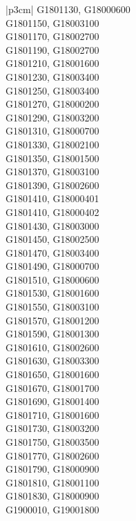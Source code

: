 \begin{customLongTable}{ |p{3cm}| }
G1801130, G18000600 \\ \hline
G1801150, G18003100 \\ \hline
G1801170, G18002700 \\ \hline
G1801190, G18002700 \\ \hline
G1801210, G18001600 \\ \hline
G1801230, G18003400 \\ \hline
G1801250, G18003400 \\ \hline
G1801270, G18000200 \\ \hline
G1801290, G18003200 \\ \hline
G1801310, G18000700 \\ \hline
G1801330, G18002100 \\ \hline
G1801350, G18001500 \\ \hline
G1801370, G18003100 \\ \hline
G1801390, G18002600 \\ \hline
G1801410, G18000401 \\ \hline
G1801410, G18000402 \\ \hline
G1801430, G18003000 \\ \hline
G1801450, G18002500 \\ \hline
G1801470, G18003400 \\ \hline
G1801490, G18000700 \\ \hline
G1801510, G18000600 \\ \hline
G1801530, G18001600 \\ \hline
G1801550, G18003100 \\ \hline
G1801570, G18001200 \\ \hline
G1801590, G18001300 \\ \hline
G1801610, G18002600 \\ \hline
G1801630, G18003300 \\ \hline
G1801650, G18001600 \\ \hline
G1801670, G18001700 \\ \hline
G1801690, G18001400 \\ \hline
G1801710, G18001600 \\ \hline
G1801730, G18003200 \\ \hline
G1801750, G18003500 \\ \hline
G1801770, G18002600 \\ \hline
G1801790, G18000900 \\ \hline
G1801810, G18001100 \\ \hline
G1801830, G18000900 \\ \hline
G1900010, G19001800 \\ \hline

\end{customLongTable}
